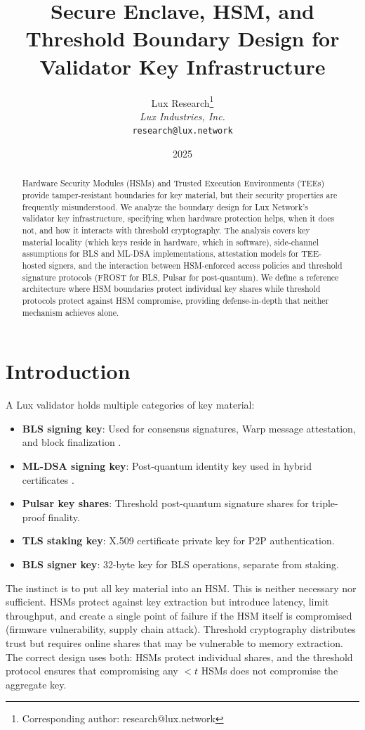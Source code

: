 \documentclass[11pt]{article}
\title{Secure Enclave, HSM, and Threshold Boundary Design for Validator Key Infrastructure}
\author{
Lux Research\thanks{Corresponding author: research@lux.network}\\
\textit{Lux Industries, Inc.}\\
\texttt{research@lux.network}
}
\date{2025}
\begin{document}
\luxcoverpage

\begin{abstract}
Hardware Security Modules (HSMs) and Trusted Execution Environments (TEEs) provide tamper-resistant boundaries for key material, but their security properties are frequently misunderstood. We analyze the boundary design for Lux Network's validator key infrastructure, specifying when hardware protection helps, when it does not, and how it interacts with threshold cryptography. The analysis covers key material locality (which keys reside in hardware, which in software), side-channel assumptions for BLS and ML-DSA implementations, attestation models for TEE-hosted signers, and the interaction between HSM-enforced access policies and threshold signature protocols (FROST for BLS, Pulsar for post-quantum). We define a reference architecture where HSM boundaries protect individual key shares while threshold protocols protect against HSM compromise, providing defense-in-depth that neither mechanism achieves alone.
\end{abstract}

\section{Introduction}

A Lux validator holds multiple categories of key material:
\begin{itemize}
\item \textbf{BLS signing key}: Used for consensus signatures, Warp message attestation, and block finalization \cite{quasar}.
\item \textbf{ML-DSA signing key}: Post-quantum identity key used in hybrid certificates \cite{hybrid-certs}.
\item \textbf{Pulsar key shares}: Threshold post-quantum signature shares for triple-proof finality.
\item \textbf{TLS staking key}: X.509 certificate private key for P2P authentication.
\item \textbf{BLS signer key}: 32-byte key for BLS operations, separate from staking.
\end{itemize}

The instinct is to put all key material into an HSM. This is neither necessary nor sufficient. HSMs protect against key extraction but introduce latency, limit throughput, and create a single point of failure if the HSM itself is compromised (firmware vulnerability, supply chain attack). Threshold cryptography distributes trust but requires online shares that may be vulnerable to memory extraction. The correct design uses both: HSMs protect individual shares, and the threshold protocol ensures that compromising any $< t$ HSMs does not compromise the aggregate key.
\end{document}
